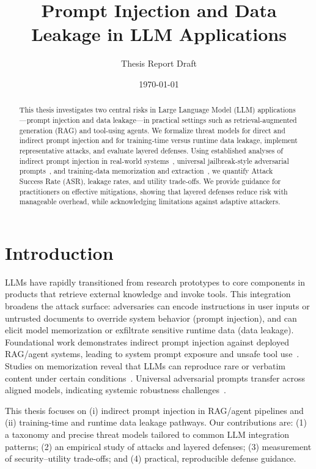 \documentclass[11pt]{article}
\title{Prompt Injection and Data Leakage in LLM Applications}
\author{Thesis Report Draft}
\date{\today}
\begin{document}
\maketitle

\begin{abstract}
This thesis investigates two central risks in Large Language Model (LLM) applications—prompt injection and data leakage—in practical settings such as retrieval-augmented generation (RAG) and tool-using agents. We formalize threat models for direct and indirect prompt injection and for training-time versus runtime data leakage, implement representative attacks, and evaluate layered defenses. Using established analyses of indirect prompt injection in real-world systems~\cite{greshake2023prompt}, universal jailbreak-style adversarial prompts~\cite{zou2023universal}, and training-data memorization and extraction~\cite{carlini2021extracting,carlini2022quantifying}, we quantify Attack Success Rate (ASR), leakage rates, and utility trade-offs. We provide guidance for practitioners on effective mitigations, showing that layered defenses reduce risk with manageable overhead, while acknowledging limitations against adaptive attackers.
\end{abstract}

\section{Introduction}
LLMs have rapidly transitioned from research prototypes to core components in products that retrieve external knowledge and invoke tools. This integration broadens the attack surface: adversaries can encode instructions in user inputs or untrusted documents to override system behavior (prompt injection), and can elicit model memorization or exfiltrate sensitive runtime data (data leakage). Foundational work demonstrates indirect prompt injection against deployed RAG/agent systems, leading to system prompt exposure and unsafe tool use~\cite{greshake2023prompt}. Studies on memorization reveal that LLMs can reproduce rare or verbatim content under certain conditions~\cite{carlini2021extracting,carlini2022quantifying}. Universal adversarial prompts transfer across aligned models, indicating systemic robustness challenges~\cite{zou2023universal}.

This thesis focuses on (i) indirect prompt injection in RAG/agent pipelines and (ii) training-time and runtime data leakage pathways. Our contributions are: (1) a taxonomy and precise threat models tailored to common LLM integration patterns; (2) an empirical study of attacks and layered defenses; (3) measurement of security--utility trade-offs; and (4) practical, reproducible defense guidance.
\end{document}
